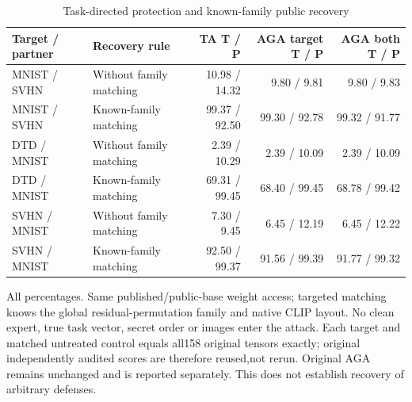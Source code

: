 \begin{table}[!htbp]
\centering
\small
\caption{Task-directed protection and known-family public recovery}
\label{tab:task_directed_recovery}
\begin{tabular}{llrrr}
\toprule
Target / partner & Recovery rule & TA T / P & AGA target T / P & AGA both T / P \\
\midrule
MNIST / SVHN & Without family matching & 10.98 / 14.32 & 9.80 / 9.81 & 9.80 / 9.83 \\
MNIST / SVHN & Known-family matching & 99.37 / 92.50 & 99.30 / 92.78 & 99.32 / 91.77 \\
DTD / MNIST & Without family matching & 2.39 / 10.29 & 2.39 / 10.09 & 2.39 / 10.09 \\
DTD / MNIST & Known-family matching & 69.31 / 99.45 & 68.40 / 99.45 & 68.78 / 99.42 \\
SVHN / MNIST & Without family matching & 7.30 / 9.45 & 6.45 / 12.19 & 6.45 / 12.22 \\
SVHN / MNIST & Known-family matching & 92.50 / 99.37 & 91.56 / 99.39 & 91.77 / 99.32 \\
\bottomrule
\end{tabular}
\par\vspace{3pt}\begin{minipage}{0.98\linewidth}\footnotesize All percentages. Same published/public-base weight access; targeted matching knows the global residual-permutation family and native CLIP layout. No clean expert, true task vector, secret order or images enter the attack. Each target and matched untreated control equals all158 original tensors exactly; original independently audited scores are therefore reused,not rerun. Original AGA remains unchanged and is reported separately. This does not establish recovery of arbitrary defenses.\end{minipage}
\end{table}

